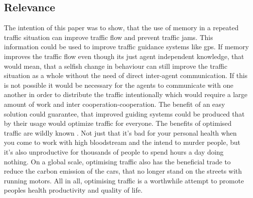 \documentclass[a4paper,hidelinks]{article}
\begin{document}
\subsection{Relevance}
The intention of this paper was to show, that the use of memory in a repeated traffic situation can improve traffic flow and prevent traffic jams. This information could be used to improve traffic guidance systems like gps. If memory improves the traffic flow even though its just agent independent knowledge, that would mean, that a selfish change in behaviour can still improve the traffic situation as a whole without the need of direct inter-agent communication. If this is not possible it would be necessary for the agents to communicate with one another in order to distribute the traffic intentionally which would require a large amount of work and inter cooperation-cooperation. 
The benefit of an easy solution could guarantee, that improved guiding systems could be produced that by their usage would optimize traffic for everyone. The benefits of optimised traffic are wildly known \cite{france2003multiagent}. Not just that it's bad for your personal health when you come to work with high bloodstream and the intend to murder people, but it's also unproductive for thousands of people to spend hours a day doing nothing. On a global scale, optimising traffic also has the beneficial trade to reduce the carbon emission of the cars, that no longer stand on the streets with running motors. All in all, optimising traffic is a worthwhile attempt to promote peoples health productivity and quality of life. 




\end{document}

